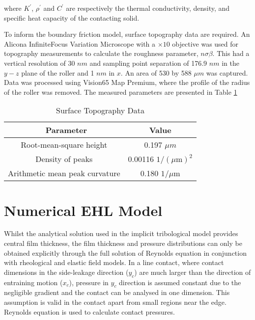 where $K^{\prime}$, $\rho^{\prime}$ and $C^{\prime}$ are respectively the thermal conductivity, density, and specific heat capacity of the contacting solid. 

To inform the boundary friction model, surface topography data are required. An Alicona InfiniteFocus Variation Microscope with a $\times 10$ objective was used for topography measurements to calculate the roughness parameter, $n\sigma\beta$. This had a vertical resolution of 30 $nm$ and sampling point separation of 176.9 $nm$ in the $y-z$ plane of the roller and 1 $nm$ in $x$. An area of 530 by 588 $\mu m$ was captured. Data was processed using Vision65 Map Premium, where the profile of the radius of the roller was removed. The measured parameters are presented in Table \ref{Surface Topography Data}

\begin{table*}
	\caption{Surface Topography Data}
	\label{Surface Topography Data}
	\centering
	\renewcommand{\arraystretch}{1.5}%
	\begin{tabular}{|c|c|}
		\hline
		\ \textbf{Parameter} & \textbf{Value} \\ [0.5ex]
		\hline
		Root-mean-square height & 0.197 $\mu m$ \\ [0.5ex]
		\hline
		Density of peaks & 0.00116 $1 /(\mu \mathrm{m})^2$ \\ [0.5ex]
		\hline
		Arithmetic mean peak curvature & 0.180 $1 / \mu \mathrm{m}$ \\ [0.5ex]
		\hline
	\end{tabular}
\end{table*}

\section{Numerical EHL Model}\label{1D EHL Model}

Whilst the analytical solution used in the implicit tribological model provides central film thickness, the film thickness and pressure distributions can only be obtained explicitly through the full solution of Reynolds equation in conjunction with rheological and elastic field models. In a line contact, where contact dimensions in the side-leakage direction ($y_c$) are much larger than the direction of entraining motion ($x_c$), pressure in $y_c$ direction is assumed constant due to the negligible gradient and the contact can be analysed in one dimension. This assumption is valid in the contact apart from small regions near the edge. Reynolds equation is used to calculate contact pressures.

